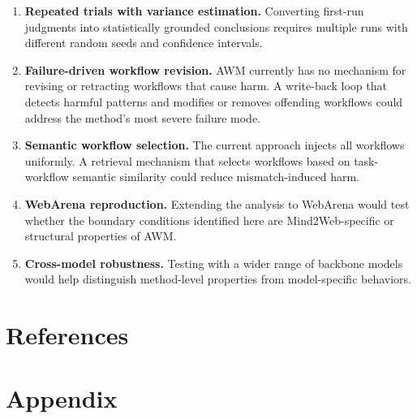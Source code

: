 \documentclass{article}
\begin{document}
\begin{enumerate}
\def\labelenumi{\arabic{enumi}.}
\item
  \textbf{Repeated trials with variance estimation.} Converting
  first-run judgments into statistically grounded conclusions requires
  multiple runs with different random seeds and confidence intervals.
\item
  \textbf{Failure-driven workflow revision.} AWM currently has no
  mechanism for revising or retracting workflows that cause harm. A
  write-back loop that detects harmful patterns and modifies or removes
  offending workflows could address the method's most severe failure
  mode.
\item
  \textbf{Semantic workflow selection.} The current approach injects all
  workflows uniformly. A retrieval mechanism that selects workflows
  based on task-workflow semantic similarity could reduce
  mismatch-induced harm.
\item
  \textbf{WebArena reproduction.} Extending the analysis to WebArena
  would test whether the boundary conditions identified here are
  Mind2Web-specific or structural properties of AWM.
\item
  \textbf{Cross-model robustness.} Testing with a wider range of
  backbone models would help distinguish method-level properties from
  model-specific behaviors.
\end{enumerate}

\section{References}\label{references}

\printbibliography[heading=none]

\clearpage
\appendix
\section{Appendix}\label{appendix}

\setcounter{table}{0}
\renewcommand{\thetable}{A\arabic{table}}

{\small
\setlength{\tabcolsep}{5pt}
\renewcommand{\arraystretch}{1.15}
\setlength{\LTleft}{0pt}
\setlength{\LTright}{0pt}

}


\end{document}
